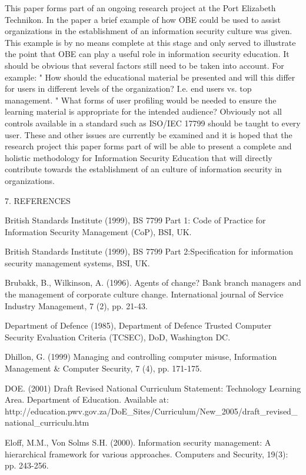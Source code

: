 This paper forms part of an ongoing research project at the Port
Elizabeth Technikon. In the paper a brief example of how OBE could
be used to assist organizations in the establishment of an
information security culture was given. This example is by no
means complete at this stage and only served to illustrate the
point that OBE can play a useful role in information security
education. It should be obvious that several factors still need to
be taken into account. For example: "   How should the educational
material be presented and will this differ for users in different
levels of the organization? I.e. end users vs. top management. "
What forms of user profiling would be needed to ensure the
learning material is appropriate for the intended audience?
Obviously not all controls available in a standard such as ISO/IEC
17799 should be taught to every user. These and other issues are
currently be examined and it is hoped that the research project
this paper forms part of will be able to present a complete and
holistic methodology for Information Security Education that will
directly contribute towards the establishment of an culture of
information security in organizations.

7.  REFERENCES

British Standards Institute (1999), BS 7799 Part 1: Code of
Practice for Information Security Management (CoP), BSI, UK.

British Standards Institute (1999), BS 7799 Part 2:Specification
for information security management systems, BSI, UK.

Brubakk, B., Wilkinson, A. (1996). Agents of change? Bank branch
managers and the management of corporate culture change.
International journal of Service Industry Management, 7 (2), pp.
21-43.

Department of Defence (1985), Department of Defence Trusted
Computer Security Evaluation Criteria (TCSEC), DoD, Washington DC.

Dhillon, G. (1999) Managing and controlling computer misuse,
Information Management \& Computer Security, 7 (4), pp. 171-175.

DOE. (2001) Draft Revised National Curriculum Statement:
Technology Learning Area. Department of Education. Available at:
http://education.pwv.gov.za/DoE\_Sites/Curriculum/New\_2005/draft\_revised\_national\_curriculu.htm

Eloff, M.M., Von Solms S.H. (2000). Information security
management: A hierarchical framework for various approaches.
Computers and Security, 19(3): pp. 243-256.


